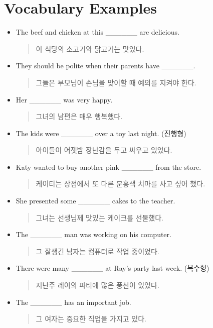 \documentclass{article}
\begin{document}
\section*{Vocabulary Examples}
\begin{addmargin}[1em]{1em}
\begin{itemize}
    \item The beef and chicken at this \_\_\_\_\_\_ are delicious.
    \begin{quote}
    이 식당의 소고기와 닭고기는 맛있다.
    \end{quote}
    \item They should be polite when their parents have \_\_\_\_\_\_.
    \begin{quote}
    그들은 부모님이 손님을 맞이할 때 예의를 지켜야 한다.
    \end{quote}
    \item Her \_\_\_\_\_\_ was very happy.
    \begin{quote}
    그녀의 남편은 매우 행복했다.
    \end{quote}
    \item The kids were \_\_\_\_\_\_ over a toy last night. (진행형)
    \begin{quote}
    아이들이 어젯밤 장난감을 두고 싸우고 있었다.
    \end{quote}
    \item Katy wanted to buy another pink \_\_\_\_\_\_ from the store.
    \begin{quote}
    케이티는 상점에서 또 다른 분홍색 치마를 사고 싶어 했다.
    \end{quote}
    \item She presented some \_\_\_\_\_\_ cakes to the teacher.
    \begin{quote}
    그녀는 선생님께 맛있는 케이크를 선물했다.
    \end{quote}
    \item The \_\_\_\_\_\_ man was working on his computer.
    \begin{quote}
    그 잘생긴 남자는 컴퓨터로 작업 중이었다.
    \end{quote}
    \item There were many \_\_\_\_\_\_ at Ray's party last week. (복수형)
    \begin{quote}
    지난주 레이의 파티에 많은 풍선이 있었다.
    \end{quote}
    \item The \_\_\_\_\_\_ has an important job.
    \begin{quote}
    그 여자는 중요한 직업을 가지고 있다.

\end{quote}
\end{itemize}
\end{addmargin}
\end{document}
